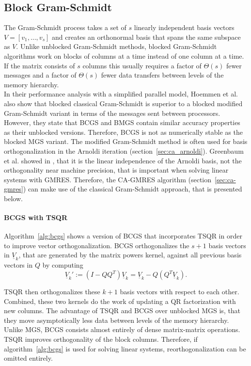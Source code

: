 \documentclass{scrartcl}
\numberwithin{equation}{section}
\begin{document}
\subsection{Block Gram-Schmidt} \label{sec:gs}
The Gram-Schmidt process takes a set of $s$ linearly independent basis vectors $V = [v_1, \ldots, v_s]$ and creates an orthonormal basis that spans the same subspace as $V$. Unlike unblocked Gram-Schmidt methods, blocked Gram-Schmidt algorithms work on blocks of columns at a time instead of one column at a time. If the matrix consists of $s$ columns this usually requires a factor of $\Theta (s)$ fewer messages and a factor of $\Theta(s)$ fewer data transfers between levels of the memory hierarchy.\\
In their performance analysis with a simplified parallel model, Hoemmen et al. \cite{Hoemmen:2010:CKS:1970638} also show that blocked classical Gram-Schmidt is superior to a blocked modified Gram-Schmidt variant in terms of the messages sent between processors. However, they state that BCGS and BMGS contain similar accuracy properties as their unblocked versions. Therefore, BCGS is not as numerically stable as the blocked MGS variant. The modified Gram-Schmidt method is often used for basis orthogonalization in the Arnoldi iteration (section~\ref{sec:ca_arnoldi}). Greenbaum et al. showed in \cite{Greenbaum97numericalbehaviour}, that it is the linear independence of the Arnoldi basis, not the orthogonality near machine precision, that is important when solving linear systems with GMRES. Therefore, the CA-GMRES algorithm (section~\ref{sec:ca-gmres}) can make use of the classical Gram-Schmidt approach, that is presented below.

\paragraph{BCGS with TSQR} Algorithm~\ref{alg:bcgs} shows a version of BCGS that incorporates TSQR in order to improve vector orthogonalization. BCGS orthogonalizes the $s + 1$ basis vectors in $\underline{V}_k$, that are generated by the matrix powers kernel, against all previous basis vectors in $Q$ by computing
\begin{equation}
	\underline{V}_k' := (I - QQ^T)\underline{V}_k = \underline{V}_k - Q(Q^T\underline{V}_k).
\end{equation}

TSQR then orthogonalizes these $k + 1$ basis vectors with respect to each other. Combined, these two kernels do the work of updating a QR factorization with new columns. The advantage of TSQR and BCGS over unblocked MGS is, that they move asymptotically less data between levels of the memory hierarchy. Unlike MGS, BCGS consists almost entirely of dense matrix-matrix operations. TSQR improves orthogonality of the block columns. Therefore, if algorithm~\ref{alg:bcgs} is used for solving linear systems, reorthogonalization can be omitted entirely.
\end{document}
